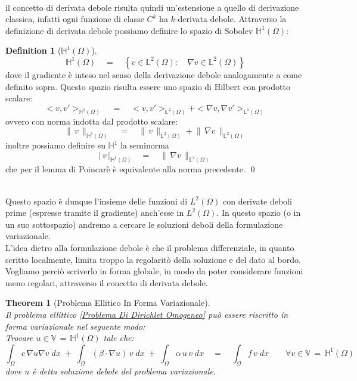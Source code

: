 \documentclass[12pt,a4paper]{report}
\theoremstyle{theorem}
\newtheorem{theorem}{Theorem}[section]
\theoremstyle{theorem}
\theoremstyle{definition}
\newtheorem{definition}{Definition}[section]
\providecommand{\abs}[1]{\lvert \, #1 \, \rvert}
\providecommand{\norm}[1]{\lVert \, #1 \, \rVert}
\begin{document}
\hfill \\
il concetto di derivata debole risulta quindi un'estensione a quello di derivazione classica, infatti ogni funzione di classe $C^k$ ha $k$-derivata debole.
Attraverso la definizione di derivata debole possiamo definire lo spazio di Sobolev $\mathbb{H}^{1}(\Omega)$:
\begin{definition} [\textbf{$\mathbb{H}^{1}(\Omega)$}]  \label{Spazio H1}
\hfill \\
\[ \mathbb{H}^{1}(\Omega) \quad = \quad \left \{ v \in \mathbb{L}^{2}(\Omega): \quad \nabla{v} \in \mathbb{L}^{2}(\Omega) \right \}	\]
dove il gradiente è inteso nel senso della derivazione debole analogamente a come definito sopra. Questo spazio risulta essere uno spazio di Hilbert con prodotto scalare:
\[ < v, v' >_{\mathbb{H}^{1}(\Omega)} \quad = \quad < v, v' >_{\mathbb{L}^{2}(\Omega)} + < \nabla{v}, \nabla{v}' >_{\mathbb{L}^{1}(\Omega)}\]
ovvero con norma indotta dal prodotto scalare:
\[ \norm{v}_{\mathbb{H}^{1}(\Omega)}\quad = \quad \norm{v}_{\mathbb{L}^{2}(\Omega)} + \norm{\nabla{v}}_{\mathbb{L}^{2}(\Omega)} \]
inoltre possiamo definire su $\mathbb{H}^{1}$ la seminorma
\[ \abs{v}_{\mathbb{H}^{1}(\Omega)}\quad = \quad  \norm{\nabla{v}}_{\mathbb{L}^{2}(\Omega)} \]
che per il lemma di Poincarè è equivalente alla norma precedente.
\qed
\end{definition}
\hfill \\
Questo spazio è dunque l'insieme delle funzioni di $L^{2}(\Omega)$ con derivate deboli prime (espresse tramite il gradiente) anch'esse in $L^{2}(\Omega)$. In questo spazio (o in un suo sottospazio) andremo a cercare le soluzioni deboli della formulazione variazionale. \\
L'idea dietro alla formulazione debole è che il problema differenziale, in quanto scritto localmente, limita troppo la regolaritò della soluzione e del dato al bordo. Vogliamo perciò scriverlo in forma globale, in modo da poter considerare funzioni meno regolari, attraverso il concetto di derivata debole.
\begin{theorem} [Problema Ellitico In Forma Variazionale]  \label{Problema Ellittico Debole}
\hfill \\
Il problema ellittico \ref{Problema Di Dirichlet Omogeneo} può essere riscritto in forma variazionale nel seguente modo:\\
Trovare $u \in  \mathbb{V} \, = \, \mathbb{H}^{1}(\Omega)$ tale che:
\[ \int_{\Omega}{c \, \nabla u \nabla v \; dx} \; + \; \int_{\Omega}{(\beta \cdot \nabla u) \, v \; dx} \; + \; \int_{\Omega}{\alpha \, u \, v \; dx} \quad = \quad \int_{\Omega}{f \, v \; dx} \qquad \forall v \in \mathbb{V} \, = \, \mathbb{H}^{1}(\Omega) \]
dove $u$ è detta soluzione debole del problema variazionale.
\end{theorem}
\end{document}
